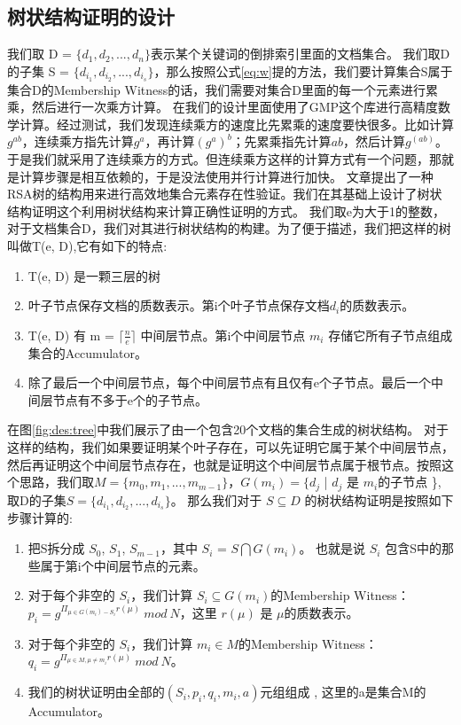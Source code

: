 \subsection{树状结构证明的设计}

我们取 D = $\{d_1, d_2, ..., d_n\}$表示某个关键词的倒排索引里面的文档集合。
我们取D的子集 S = $\{d_{i_1}, d_{i_2}, ..., d_{i_s}\}$，那么按照公式\ref{eq:w}提的方法，我们要计算集合S属于集合D的Membership Witness的话，我们需要对集合D里面的每一个元素进行累乘，然后进行一次乘方计算。
在我们的设计里面使用了GMP这个库进行高精度数学计算。经过测试，我们发现连续乘方的速度比先累乘的速度要快很多。比如计算$g^{ab}$，连续乘方指先计算$g^a$，再计算$(g^a)^b$；先累乘指先计算$ab$，然后计算$g^{(ab)}$。于是我们就采用了连续乘方的方式。但连续乘方这样的计算方式有一个问题，那就是计算步骤是相互依赖的，于是没法使用并行计算进行加快。
文章\cite{papamanthou2008authenticated}提出了一种RSA树的结构用来进行高效地集合元素存在性验证。我们在其基础上设计了树状结构证明这个利用树状结构来计算正确性证明的方式。
我们取e为大于1的整数，对于文档集合D，我们对其进行树状结构的构建。为了便于描述，我们把这样的树叫做T(e, D),它有如下的特点:
\begin{enumerate}
  \item T(e, D) 是一颗三层的树
  \item 叶子节点保存文档的质数表示。第i个叶子节点保存文档$d_i$的质数表示。
  \item T(e, D) 有 m = $\lceil \frac{n}{e} \rceil$ 中间层节点。第i个中间层节点 $m_i$ 存储它所有子节点组成集合的Accumulator。
  \item 除了最后一个中间层节点，每个中间层节点有且仅有e个子节点。最后一个中间层节点有不多于e个的子节点。
\end{enumerate}

在图\ref{fig:des:tree}中我们展示了由一个包含20个文档的集合生成的树状结构。
对于这样的结构，我们如果要证明某个叶子存在，可以先证明它属于某个中间层节点，然后再证明这个中间层节点存在，也就是证明这个中间层节点属于根节点。按照这个思路，我们取$M = \{m_0, m_1, ..., m_{m-1}\}$，$G(m_i) = \{d_j$ | $d_j$ 是 $m_i$的子节点 \}, 取D的子集$S = \{d_{i_1}, d_{i_2}, ..., d_{i_s}\}$。 那么我们对于 $S \subseteq D$ 的树状结构证明是按照如下步骤计算的:
\begin{enumerate}
  \item 把S拆分成 $S_0$, $S_1$, $S_{m-1}$，其中 $S_i$ = $S \bigcap G(m_i)$。 也就是说 $S_i$ 包含S中的那些属于第i个中间层节点的元素。
  \item 对于每个非空的 $S_i$，我们计算 $S_i \subseteq G(m_i)$的Membership Witness：$p_i = g^{\Pi_{\mu \in G(m_i) - S_i} r(\mu)}\ mod\ N$，这里 $r(\mu)$ 是 $\mu$的质数表示。 
  \item 对于每个非空的 $S_i$，我们计算 $m_i \in M$的Membership Witness：$q_i =  g^{\Pi_{\mu \in M, \mu \ne m_i} r(\mu)}\ mod\ N$。
  \item 我们的树状证明由全部的$(S_i, p_i, q_i, m_i, a)$元组组成 , 这里的a是集合M的Accumulator。
\end{enumerate}


